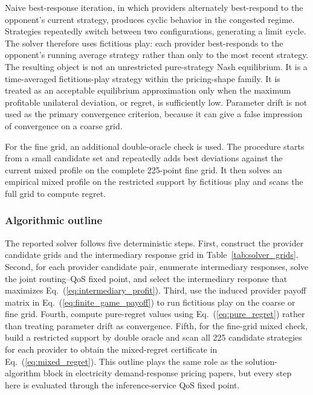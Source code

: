 \documentclass[11pt,a4paper]{article}
\begin{document}
Naive best-response iteration, in which providers alternately best-respond to the opponent's current strategy, produces cyclic behavior in the congested regime. Strategies repeatedly switch between two configurations, generating a limit cycle. The solver therefore uses fictitious play: each provider best-responds to the opponent's running average strategy rather than only to the most recent strategy. The resulting object is not an unrestricted pure-strategy Nash equilibrium. It is a time-averaged fictitious-play strategy within the pricing-shape family. It is treated as an acceptable equilibrium approximation only when the maximum profitable unilateral deviation, or regret, is sufficiently low. Parameter drift is not used as the primary convergence criterion, because it can give a false impression of convergence on a coarse grid.

For the fine grid, an additional double-oracle check is used. The procedure starts from a small candidate set and repeatedly adds best deviations against the current mixed profile on the complete 225-point fine grid. It then solves an empirical mixed profile on the restricted support by fictitious play and scans the full grid to compute regret.

\subsubsection{Algorithmic outline}
The reported solver follows five deterministic steps. First, construct the provider candidate grids and the intermediary response grid in Table~\ref{tab:solver_grids}. Second, for each provider candidate pair, enumerate intermediary responses, solve the joint routing--QoS fixed point, and select the intermediary response that maximizes Eq.~(\ref{eq:intermediary_profit}). Third, use the induced provider payoff matrix in Eq.~(\ref{eq:finite_game_payoff}) to run fictitious play on the coarse or fine grid. Fourth, compute pure-regret values using Eq.~(\ref{eq:pure_regret}) rather than treating parameter drift as convergence. Fifth, for the fine-grid mixed check, build a restricted support by double oracle and scan all 225 candidate strategies for each provider to obtain the mixed-regret certificate in Eq.~(\ref{eq:mixed_regret}). This outline plays the same role as the solution-algorithm block in electricity demand-response pricing papers, but every step here is evaluated through the inference-service QoS fixed point.
\end{document}
